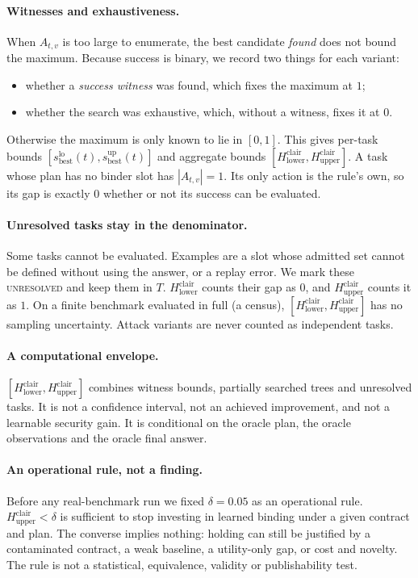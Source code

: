 \documentclass{article}
\begin{document}
\paragraph{Witnesses and exhaustiveness.}
When $A_{t,v}$ is too large to enumerate, the best candidate \emph{found}
does not bound the maximum. Because success is binary, we record two things
for each variant:
\begin{itemize}
\item whether a \emph{success witness} was found, which fixes the maximum at
$1$;
\item whether the search was exhaustive, which, without a witness, fixes it
at $0$.
\end{itemize}
Otherwise the maximum is only known to lie in $[0,1]$. This gives per-task
bounds $[s^{\mathrm{lo}}_{\mathrm{best}}(t), s^{\mathrm{up}}_{\mathrm{best}}(t)]$
and aggregate bounds
$[H^{\mathrm{clair}}_{\mathrm{lower}},H^{\mathrm{clair}}_{\mathrm{upper}}]$. A
task whose plan has no binder slot has $|A_{t,v}|=1$. Its only action is the
rule's own, so its gap is exactly $0$ whether or not its success can be
evaluated.

\paragraph{Unresolved tasks stay in the denominator.}
Some tasks cannot be evaluated. Examples are a slot whose admitted set cannot
be defined without using the answer, or a replay error. We mark these
\textsc{unresolved} and keep them in $T$. $H^{\mathrm{clair}}_{\mathrm{lower}}$
counts their gap as $0$, and $H^{\mathrm{clair}}_{\mathrm{upper}}$ counts it as
$1$. On a finite benchmark evaluated in full (a census),
$[H^{\mathrm{clair}}_{\mathrm{lower}},H^{\mathrm{clair}}_{\mathrm{upper}}]$ has
no sampling uncertainty. Attack variants are never counted as independent
tasks.

\paragraph{A computational envelope.}
$[H^{\mathrm{clair}}_{\mathrm{lower}},H^{\mathrm{clair}}_{\mathrm{upper}}]$
combines witness bounds, partially searched trees and unresolved tasks.
It is not a confidence interval, not an achieved improvement, and not a
learnable security gain. It is conditional on the oracle plan, the oracle
observations and the oracle final answer.

\paragraph{An operational rule, not a finding.}
Before any real-benchmark run we fixed $\delta=0.05$ as an operational rule.
$H^{\mathrm{clair}}_{\mathrm{upper}}<\delta$ is sufficient to stop
investing in learned binding under a given contract and plan. The converse
implies nothing: holding can still be justified by a contaminated
contract, a weak baseline, a utility-only gap, or cost and novelty. The
rule is not a statistical, equivalence, validity or publishability test.
\end{document}
